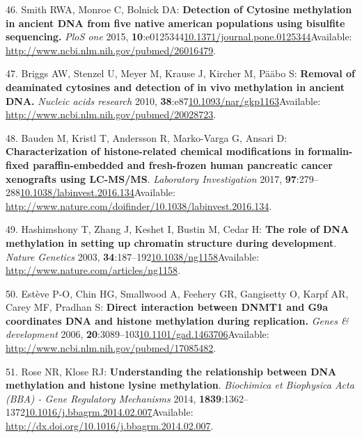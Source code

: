 \documentclass[
]{book}
\begin{document}
\leavevmode\hypertarget{ref-Smith2015}{}%
46. Smith RWA, Monroe C, Bolnick DA: \textbf{Detection of Cytosine methylation in ancient DNA from five native american populations using bisulfite sequencing.} \emph{PloS one} 2015, \textbf{10}:e0125344\href{https://doi.org/10.1371/journal.pone.0125344}{10.1371/journal.pone.0125344}Available: \url{http://www.ncbi.nlm.nih.gov/pubmed/26016479}.

\leavevmode\hypertarget{ref-Briggs2010}{}%
47. Briggs AW, Stenzel U, Meyer M, Krause J, Kircher M, Pääbo S: \textbf{Removal of deaminated cytosines and detection of in vivo methylation in ancient DNA.} \emph{Nucleic acids research} 2010, \textbf{38}:e87\href{https://doi.org/10.1093/nar/gkp1163}{10.1093/nar/gkp1163}Available: \url{http://www.ncbi.nlm.nih.gov/pubmed/20028723}.

\leavevmode\hypertarget{ref-Bauden2017}{}%
48. Bauden M, Kristl T, Andersson R, Marko-Varga G, Ansari D: \textbf{Characterization of histone-related chemical modifications in formalin-fixed paraffin-embedded and fresh-frozen human pancreatic cancer xenografts using LC-MS/MS}. \emph{Laboratory Investigation} 2017, \textbf{97}:279--288\href{https://doi.org/10.1038/labinvest.2016.134}{10.1038/labinvest.2016.134}Available: \url{http://www.nature.com/doifinder/10.1038/labinvest.2016.134}.

\leavevmode\hypertarget{ref-Hashimshony2003}{}%
49. Hashimshony T, Zhang J, Keshet I, Bustin M, Cedar H: \textbf{The role of DNA methylation in setting up chromatin structure during development}. \emph{Nature Genetics} 2003, \textbf{34}:187--192\href{https://doi.org/10.1038/ng1158}{10.1038/ng1158}Available: \url{http://www.nature.com/articles/ng1158}.

\leavevmode\hypertarget{ref-Esteve2006}{}%
50. Estève P-O, Chin HG, Smallwood A, Feehery GR, Gangisetty O, Karpf AR, Carey MF, Pradhan S: \textbf{Direct interaction between DNMT1 and G9a coordinates DNA and histone methylation during replication.} \emph{Genes \& development} 2006, \textbf{20}:3089--103\href{https://doi.org/10.1101/gad.1463706}{10.1101/gad.1463706}Available: \url{http://www.ncbi.nlm.nih.gov/pubmed/17085482}.

\leavevmode\hypertarget{ref-Rose2014}{}%
51. Rose NR, Klose RJ: \textbf{Understanding the relationship between DNA methylation and histone lysine methylation}. \emph{Biochimica et Biophysica Acta (BBA) - Gene Regulatory Mechanisms} 2014, \textbf{1839}:1362--1372\href{https://doi.org/10.1016/j.bbagrm.2014.02.007}{10.1016/j.bbagrm.2014.02.007}Available: \url{http://dx.doi.org/10.1016/j.bbagrm.2014.02.007}.
\end{document}
